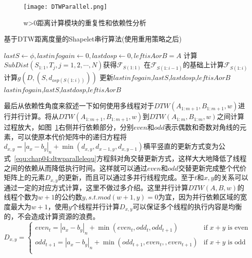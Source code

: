 \begin{figure}[H] %
	\centering
	\texttt{[image: DTWParallel.png]}
	\caption{w>0距离计算模块的重复性和依赖性分析}
	\label{fig:DTWParallel}
\end{figure}
\begin{algorithm}
	\caption{基于DTW距离度量的Shapelet串行算法(使用重用策略之后)}
	\label{alg:originplus}
	\begin{algorithmic}[1]
			\State $lastS \gets \phi, lastinfogain \gets 0, lastdosp \gets 0, leftisAorB = A$
						\State 计算$SubDist(S_{1:1},T_j,j=1,2,\cdots,N)$获得$\mathcal{F}_{S(1:1)}$ \label{dtw1}
					\Else
						\State 在$\mathcal{F}_{S(1:i-1)}$的基础上计算$\mathcal{F}_{S(1:i)}$ \label{dtw16basedtw15}
					\EndIf
					\State 计算$g(D,(S,d_{osp(S(1:i))}))$
						\State 更新$lastinfogain$,$lastS$,$lastdosp$,$leftisAorB$
					\EndIf
				\EndFor
			\EndFor
			\State \Return $lastinfogain$,$lastS$,$lastdosp$,$leftisAorB$
		\EndFunction
	\end{algorithmic}
\end{algorithm}

最后从依赖性角度来叙述一下如何使用多线程对于$DTW(A_{1:m+1},B_{1:m+1},w)$进行并行计算。将从$DTW(A_{1:m+1},B_{1:m+1},w)$到$DTW(A_{1:m},B_{1:m},w)$之间计算过程放大，如图~\ref{fig:DTWParallel}右侧并行依赖部分，分别$even$和$odd$表示偶数和奇数对角线的元素，可以使原本代价矩阵中的递归方程将$d_{x,y}=|a_x-b_y|_n + \min(d_{x,y},d_{x-1,y},d_{x,y-1})$横平竖直的更新方式变为公式~\ref{equ:chap04:dtwparallelequ}方程斜对角交替更新方式，这样大大地降低了线程之间的依赖从而降低执行时间。这样就可以通过$even$和$odd$交替更新完成整个代价矩阵上的元素$D_{x,y}$的更新，而且可以通过多并行线程完成。至于$t$和$x,y$的关系可以通过一定的对应方式计算，这里不做过多介绍。这里并行计算$DTW(A,B,w)$的线程个数为$w+1$的公约数$y,s.t. mod(w+1,y)=0$为宜，因为并行依赖区域的宽度最大为$w+1$，使用$y$个线程并行计算$D_{x,y}$可以保证多个线程的执行内容是均衡的，不会造成计算资源的浪费。
\begin{equation}
\label{equ:chap04:dtwparallelequ}
D_{x,y} = 
\begin{cases}
even_t=|a_x-b_y|_n+\min(even_t,odd_t,odd_{t+1}) & \text{if $x+y$ is even }\\
odd_{t+1}=|a_x-b_y|_n+\min(odd_{t+1},even_t,,even_{t+1}) & \text{if $x+y$ is odd}\\
\end{cases}
\end{equation}

